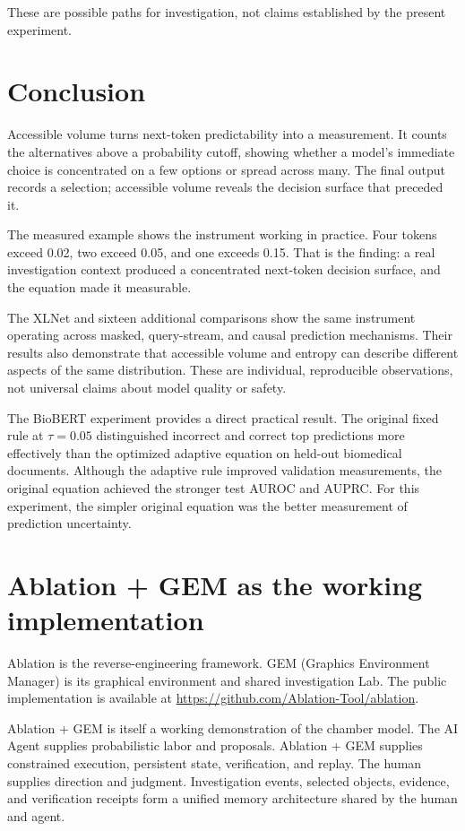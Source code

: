 \documentclass[11pt,a4paper]{article}
\begin{document}
These are possible paths for investigation, not claims established by the present experiment.

\section{Conclusion}
Accessible volume turns next-token predictability into a measurement. It counts the alternatives above a probability cutoff, showing whether a model's immediate choice is concentrated on a few options or spread across many. The final output records a selection; accessible volume reveals the decision surface that preceded it.

The measured example shows the instrument working in practice. Four tokens exceed 0.02, two exceed 0.05, and one exceeds 0.15. That is the finding: a real investigation context produced a concentrated next-token decision surface, and the equation made it measurable.

The XLNet and sixteen additional comparisons show the same instrument operating across masked, query-stream, and causal prediction mechanisms. Their results also demonstrate that accessible volume and entropy can describe different aspects of the same distribution. These are individual, reproducible observations, not universal claims about model quality or safety.

The BioBERT experiment provides a direct practical result. The original fixed rule at $\tau=0.05$ distinguished incorrect and correct top predictions more effectively than the optimized adaptive equation on held-out biomedical documents. Although the adaptive rule improved validation measurements, the original equation achieved the stronger test AUROC and AUPRC. For this experiment, the simpler original equation was the better measurement of prediction uncertainty.

\appendix

\section{Ablation + GEM as the working implementation}
Ablation is the reverse-engineering framework. GEM (Graphics Environment Manager) is its graphical environment and shared investigation Lab. The public implementation is available at \url{https://github.com/Ablation-Tool/ablation}.

Ablation + GEM is itself a working demonstration of the chamber model. The AI Agent supplies probabilistic labor and proposals. Ablation + GEM supplies constrained execution, persistent state, verification, and replay. The human supplies direction and judgment. Investigation events, selected objects, evidence, and verification receipts form a unified memory architecture shared by the human and agent.
\end{document}
